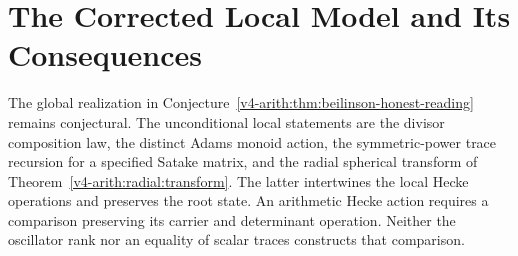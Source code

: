 \section{The Corrected Local Model and Its Consequences}
\label{v4-arith:kb:summary}

The global realization in
Conjecture~\ref{v4-arith:thm:beilinson-honest-reading} remains conjectural.
The unconditional local statements are the divisor composition law,
the distinct Adams monoid action, the symmetric-power trace
recursion for a specified Satake matrix, and the radial spherical
transform of Theorem~\ref{v4-arith:radial:transform}. The latter
intertwines the local Hecke operations and preserves the root state. An arithmetic Hecke action
requires a comparison preserving its carrier and determinant operation.
Neither the oscillator rank nor an equality of scalar traces constructs
that comparison.
